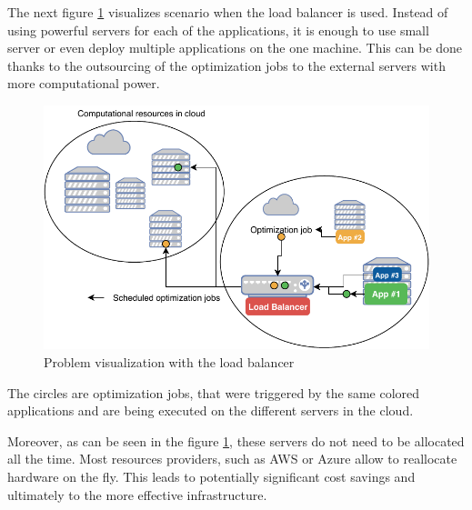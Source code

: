 The next figure \ref{fig:problem-with-load-balancer} visualizes scenario when the load balancer is used.
Instead of using powerful servers for each of the applications,
it is enough to use small server or even deploy multiple applications on the one machine.
This can be done thanks to the outsourcing of the optimization jobs to the external servers with more computational power.
\begin{figure}[ht] 
    \includegraphics[width=\textwidth]{i_problem_scheme_jobs.pdf} 
    \centering
    \caption{Problem visualization with the load balancer}
    \label{fig:problem-with-load-balancer}
\end{figure}
The circles are optimization jobs,
that were triggered by the same colored applications
and are being executed on the different servers in the cloud.

Moreover,
as can be seen in the figure \ref{fig:problem-with-load-balancer},
these servers do not need to be allocated all the time.
Most resources providers, 
such as AWS\cite{awsReference} or Azure\cite{azureReference} allow to reallocate hardware on the fly.
This leads to potentially significant cost savings 
and ultimately to the more effective infrastructure.



